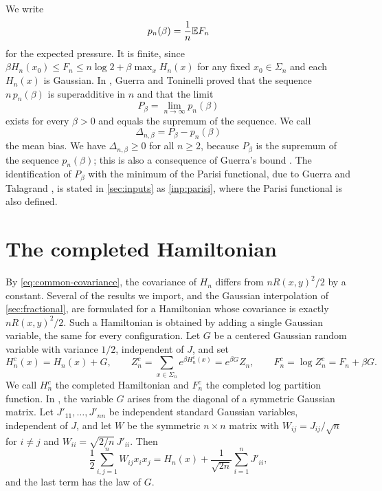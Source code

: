 We write
\[
 p_n(\beta)=\frac1n\mathbb E F_n
\]
for the expected pressure. It is finite, since $\beta H_n(x_0)\le F_n\le n\log2+\beta\max_xH_n(x)$ for any fixed $x_0\in\Sigma_n$ and each $H_n(x)$ is Gaussian.
In \cite[Theorems~1--2, (17)--(18)]{guerra-toninelli-2002}, Guerra and Toninelli proved that the sequence $n\,p_n(\beta)$ is superadditive in $n$ and that the limit
\[
 P_\beta=\lim_{n\to\infty}p_n(\beta)
\]
exists for every $\beta>0$ and equals the supremum of the sequence.
We call
\begin{equation}\label{eq:model-bias}
 \Delta_{n,\beta}=P_\beta-p_n(\beta)
\end{equation}
the mean bias. We have $\Delta_{n,\beta}\ge0$ for all $n\ge2$, because $P_\beta$ is the supremum of the sequence $p_n(\beta)$; this is also a consequence of Guerra's bound \cite[Theorem~3]{guerra-2003}.
The identification of $P_\beta$ with the minimum of the Parisi functional, due to Guerra \cite{guerra-2003} and Talagrand \cite{parisi-formula}, is stated in \cref{sec:inputs} as \cref{inp:parisi}, where the Parisi functional is also defined.

\section{The completed Hamiltonian}\label{sec:model-completion}

By \eqref{eq:common-covariance}, the covariance of $H_n$ differs from $nR(x,y)^2/2$ by a constant. Several of the results we import, and the Gaussian interpolation of \cref{sec:fractional}, are formulated for a Hamiltonian whose covariance is exactly $nR(x,y)^2/2$. Such a Hamiltonian is obtained by adding a single Gaussian variable, the same for every configuration.
Let $G$ be a centered Gaussian random variable with variance $1/2$, independent of $J$, and set
\begin{equation}\label{eq:model-completion}
 H_n^c(x)=H_n(x)+G,\qquad
 Z_n^c=\sum_{x\in\Sigma_n}e^{\beta H_n^c(x)}=e^{\beta G}Z_n,\qquad
 F_n^c=\log Z_n^c=F_n+\beta G.
\end{equation}
We call $H_n^c$ the completed Hamiltonian and $F_n^c$ the completed log partition function.
In \cite{oai-barriers,quantitative-parisi,hexagon-bias}, the variable $G$ arises from the diagonal of a symmetric Gaussian matrix. Let $J'_{11},\dots,J'_{nn}$ be independent standard Gaussian variables, independent of $J$, and let $W$ be the symmetric $n\times n$ matrix with $W_{ij}=J_{ij}/\sqrt n$ for $i\neq j$ and $W_{ii}=\sqrt{2/n}\,J'_{ii}$. Then
\[
 \frac12\sum_{i,j=1}^nW_{ij}x_ix_j=H_n(x)+\frac1{\sqrt{2n}}\sum_{i=1}^nJ'_{ii},
\]
and the last term has the law of $G$.


